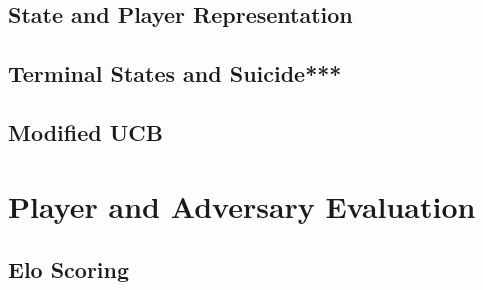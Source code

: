 \documentclass[main.tex]{subfiles}
\begin{document}
\subsection{State and Player Representation}

\subsection{Terminal States and Suicide***}

\subsection{Modified UCB}


\section{Player and Adversary Evaluation}
\subsection{Elo Scoring}
\end{document}
